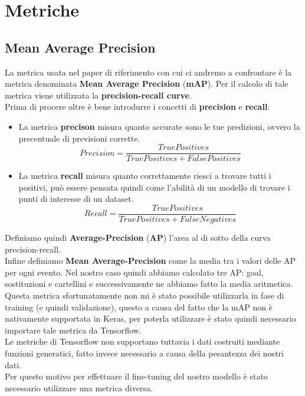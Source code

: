 \section{Metriche}
\subsection{Mean Average Precision}
La metrica usata nel paper di riferimento con cui ci andremo a confrontare è la metrica denominata \textbf{Mean Average Precision} (\textbf{mAP}). Per il calcolo di tale metrica viene utilizzata la \textbf{precision-recall curve}.
\\Prima di procere oltre è bene introdurre i concetti di \textbf{precision} e \textbf{recall}:
\begin{itemize}
\item La metrica \textbf{precison} misura quanto accurate sono le tue predizioni, ovvero la precentuale di previsioni corrette.
\begin{equation}
Precision=\frac{True Positives}{True Positives + False Positives}
\label{Precision}
\end{equation}
\item La metrica \textbf{recall} misura quanto correttamente riesci a trovare tutti i positivi, può essere pensata quindi come l'abilità di un modello di trovare i punti di interesse di un dataset.
\begin{equation}
Recall=\frac{True Positives}{True Positives + False Negatives}
\label{Recall}
\end{equation}
\end{itemize}
Definiamo quindi \textbf{Average-Precision} (\textbf{AP}) l'area al di sotto della curva precision-recall.
\\Infine definiamo \textbf{Mean Average-Precision} come la media tra i valori delle AP per ogni evento. Nel nostro caso quindi abbiamo calcolato tre AP: goal, sostituzioni e cartellini e successivamente ne abbiamo fatto la media aritmetica.
\\Questa metrica sfortunatamente non mi è stato possibile utilizzarla in fase di training (e quindi validazione), questo a causa del fatto che la mAP non è nativamente supportata in Keras, per poterla utilizzare è stato quindi necessario importare tale metrica da Tensorflow.
\\Le metriche di Tensorflow non supportano tuttavia i dati costruiti mediante funzioni generatici, fatto invece necessario a causa della pesantezza dei nostri dati.
\\Per questo motivo per effettuare il fine-tuning del nostro modello è stato necessario utilizzare una metrica diversa.
